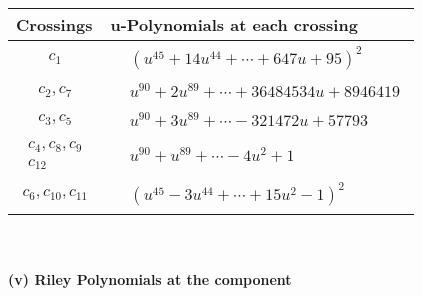 \documentclass[1p]{elsarticle_modified}
\theoremstyle{definition}
\begin{document}
\begin{tabular}{m{50pt}|m{274pt}}
Crossings & \hspace{64pt}u-Polynomials at each crossing \\
\hline $$\begin{aligned}c_{1}\end{aligned}$$&$\begin{aligned}
&(u^{45}+14 u^{44}+\cdots+647 u+95)^{2}
\end{aligned}$\\
\hline $$\begin{aligned}c_{2},c_{7}\end{aligned}$$&$\begin{aligned}
&u^{90}+2 u^{89}+\cdots+36484534 u+8946419
\end{aligned}$\\
\hline $$\begin{aligned}c_{3},c_{5}\end{aligned}$$&$\begin{aligned}
&u^{90}+3 u^{89}+\cdots-321472 u+57793
\end{aligned}$\\
\hline $$\begin{aligned}c_{4},c_{8},c_{9}\\c_{12}\end{aligned}$$&$\begin{aligned}
&u^{90}+u^{89}+\cdots-4 u^2+1
\end{aligned}$\\
\hline $$\begin{aligned}c_{6},c_{10},c_{11}\end{aligned}$$&$\begin{aligned}
&(u^{45}-3 u^{44}+\cdots+15 u^2-1)^{2}
\end{aligned}$\\
\hline
\end{tabular}\\~\\
\newpage\renewcommand{\arraystretch}{1}
\flushleft \textbf{(v) Riley Polynomials at the component}\newline \\
\end{document}

